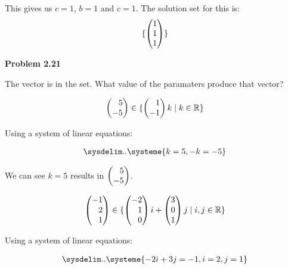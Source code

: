 \documentclass[12pt]{article}
\newenvironment{problem}[1][default]{
  \begin{framed}\begin{minipage}{0.97\textwidth}
  \setlength{\parskip}{4mm}
  {\bf Problem #1}
}{\end{minipage}\end{framed}}
\newenvironment{abc}{\begin{enumerate}[label={\bf(\alph*)}]}{\end{enumerate}}
\newcommand\m[2][]{
	\ifthenelse{\equal {#1} {}}
		{\begin{pmatrix*}[r]#2\end{pmatrix*}}
		{\left(\begin{array}{#1}#2\end{array}\right)}
}
\newcommand\resetequation[1][1]{\setcounter{equation}{#1 - 1}}
\begin{document}
\begin{abc}
\begin{item}
	This gives us $c = 1$, $b = 1$ and $c = 1$. The solution set for this is:
	\begin{equation}
		\{ \m{1 \\ 1 \\ 1} \}
	\end{equation}
	\end{item}
\end{abc}

\begin{problem}[2.21]
	The vector is in the set. What value of the paramaters produce that vector?
\end{problem}

\begin{abc}
	\begin{item}
	\resetequation

	\begin{equation}
	\begin{aligned}
		\m{5 \\ - 5} \in \{ \m{1 \\ -1}k \mid k \in \mathbb{R} \}
	\end{aligned}
	\end{equation}
	
	Using a system of linear equations:

	\begin{equation}
	\begin{aligned}
		\sysdelim..\systeme{k = 5, -k = -5}
	\end{aligned}
	\end{equation}

	We can see $k = 5$ results in $\m{5 \\ - 5}$.
	\end{item}

	\begin{item}

	\begin{equation}
	\begin{aligned}
		\m{-1 \\ 2 \\ 1} \in \{ \m{-2 \\ 1 \\ 0} i + \m{3 \\ 0 \\ 1}j \mid i, j \in \mathbb{R} \}
	\end{aligned}
	\end{equation}
	
	Using a system of linear equations:

	\begin{equation}
	\begin{aligned}
		\sysdelim..\systeme{-2i + 3j = -1, i = 2, j = 1}
	\end{aligned}
	\end{equation}
	

\end{item}
\end{abc}
\end{document}
